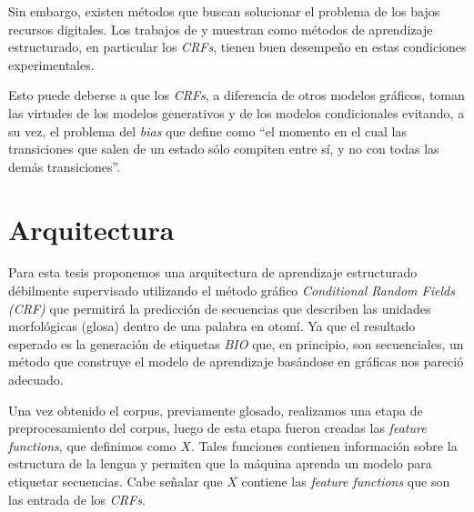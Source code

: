 \documentclass[letterpaper,12pt,oneside]{book}
\theoremstyle{definition}
\begin{document}
Sin embargo, existen métodos que buscan solucionar el problema de los bajos recursos digitales. Los trabajos de \citet{moeller2018automatic} y \citet{anastasopoulos2018part} muestran como métodos de aprendizaje estructurado, en particular los \textit{CRFs}, tienen buen desempeño en estas condiciones experimentales.

Esto puede deberse a que los \textit{CRFs}, a diferencia de otros modelos gráficos, toman las virtudes de los modelos generativos y de los modelos condicionales evitando, a su vez, el problema del \textit{bias} que \citet{lafferty2001conditional} define como ``el momento en el cual las transiciones que salen de un estado sólo compiten entre sí, y no con todas las demás transiciones''.

\section{Arquitectura}


Para esta tesis proponemos una arquitectura de aprendizaje estructurado débilmente supervisado utilizando el método gráfico \textit{Conditional Random Fields (CRF)} que permitirá la predicción de secuencias que describen las unidades morfológicas (glosa) dentro de una palabra en otomí. Ya que el resultado esperado es la generación de etiquetas \textit{BIO} que, en principio, son secuenciales, un método que construye el modelo de aprendizaje basándose en gráficas nos pareció adecuado.

Una vez obtenido el corpus, previamente glosado, realizamos una etapa de preprocesamiento del corpus, luego de esta etapa fueron creadas las \textit{feature functions}, que definimos como $X$. Tales funciones contienen información sobre la estructura de la lengua y permiten que la máquina aprenda un modelo para etiquetar secuencias. Cabe señalar que $X$ contiene las \textit{feature functions} que son las entrada de los \textit{CRFs}.
\end{document}
